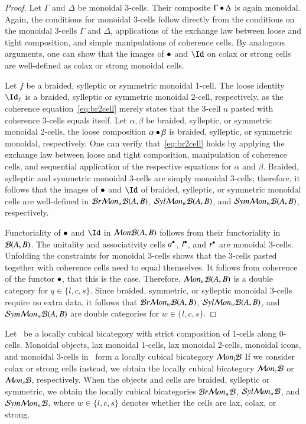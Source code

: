 \begin{proof}
Let $\Gamma$ and $\Delta$ be monoidal 3-cells. Their composite $\Gamma \bullet \Delta$ is again monoidal. Again, the conditions for monoidal 3-cells follow directly from the conditions on the monoidal 3-cells $\Gamma$ and $\Delta$, applications of the exchange law between loose and tight composition, and simple manipulations of coherence cells.
By analogous arguments, one can show that the images of $\bullet$ and $\looseid$ on colax or strong cells are well-defined as colax or strong monoidal cells. 

Let $f$ be a braided, sylleptic or symmetric monoidal 1-cell. The loose identity $\looseid_f$ is a braided, sylleptic or symmetric monoidal 2-cell, respectively, as the coherence equation~\ref{eq:br2cell} merely states that the 3-cell $u$ pasted with coherence 3-cells equals itself. Let $\alpha, \beta$ be braided, sylleptic, or symmetric monoidal 2-cells, the loose composition $\alpha \bullet \beta$ is braided, sylleptic, or symmetric monoidal, respectively. One can verify that~\ref{eq:br2cell} holds by applying the exchange law between loose and tight composition, manipulation of coherence cells, and sequential application of the respective equations for $\alpha$ and $\beta$.  Braided, sylleptic and symmetric monoidal 3-cells are simply monoidal 3-cells; therefore, it follows that the images of $\bullet$ and $\looseid$ of braided, sylleptic, or symmetric monoidal cells are well-defined in $\mathcal{B} r \mathcal{M} on_w\mathcal{B}(A,B)$, $\mathcal{S} yl \mathcal{M} on_w\mathcal{B}(A,B)$, and $\mathcal{S} ym \mathcal{M} on_w\mathcal{B}(A,B)$, respectively.

Functoriality of $\bullet$ and $\looseid$ in $\mathcal{M} on \mathcal{B}(A,B)$ follows from their functoriality in $\mathcal{B}(A,B)$. 
The unitality and associativity cells $a^{\bullet}$, $l^{\bullet}$, and $r^{\bullet}$ are monoidal 3-cells. Unfolding the constraints for monoidal 3-cells shows that the 3-cells pasted together with coherence cells need to equal themselves. It follows from coherence of the functor $\bullet$, that this is the case. Therefore,  $\mathcal{M} on_w\mathcal{B}(A,B)$ is a double category for $q \in \{l,c,s\}$. 
Since braided, symmetric, or sylleptic monoidal 3-cells require no extra data, it follows that $\mathcal{B} r \mathcal{M} on_w\mathcal{B}(A,B)$, $\mathcal{S} yl \mathcal{M} on_w\mathcal{B}(A,B)$, and $\mathcal{S} ym \mathcal{M} on_w\mathcal{B}(A,B)$ are double categories for $w \in \{l,c,s\}$.
\end{proof}

\begin{thm}\label{thm:lcbc}
Let \fB\ be a locally cubical bicategory with strict composition of 1-cells along 0-cells. Monoidal objects, lax monoidal 1-cells, lax monoidal 2-cells, monoidal icons, and monoidal 3-cells in  \fB\ form a locally cubical bicategory $\mathcal{M} on_l\mathcal{B}$ 
  If we consider colax or strong cells instead, we obtain the locally cubical bicategory $\mathcal{M} on_c\mathcal{B}$ or $\mathcal{M} on_s\mathcal{B}$, respectively. When the objects and cells are braided, sylleptic or symmetric,  we obtain the locally cubical bicategories $\mathcal{B} r \mathcal{M} on_w\mathcal{B}$, $\mathcal{S} yl \mathcal{M} on_w\mathcal{B}$, and $\mathcal{S} ym \mathcal{M} on_w\mathcal{B}$, where $w \in \{l,c,s\}$ denotes whether the cells are lax, colax, or strong.
\end{thm}

